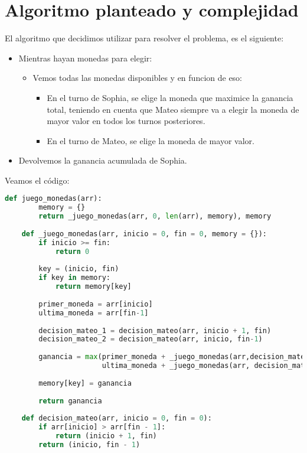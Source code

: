 \section{Algoritmo planteado y complejidad}

El algoritmo que decidimos utilizar para resolver el problema, es el siguiente:

\begin {itemize}
\item Mientras hayan monedas para elegir:
    \begin {itemize}
    \item Vemos todas las monedas disponibles y en funcion de eso:
        \begin {itemize}
        \item En el turno de Sophia, se elige la moneda que maximice la ganancia total, teniendo en cuenta que Mateo siempre va a elegir la moneda de mayor valor en todos los turnos posteriores.
        \item En el turno de Mateo, se elige la moneda de mayor valor.
        \end {itemize}
    \end {itemize}
\item Devolvemos la ganancia acumulada de Sophia.
\end {itemize}

Veamos el código:
\begin{lstlisting}[language=Python]
    def juego_monedas(arr):
        memory = {}
        return _juego_monedas(arr, 0, len(arr), memory), memory
    
    def _juego_monedas(arr, inicio = 0, fin = 0, memory = {}):
        if inicio >= fin:
            return 0
        
        key = (inicio, fin)
        if key in memory:
            return memory[key]
    
        primer_moneda = arr[inicio]
        ultima_moneda = arr[fin-1]
        
        decision_mateo_1 = decision_mateo(arr, inicio + 1, fin)
        decision_mateo_2 = decision_mateo(arr, inicio, fin-1)
    
        ganancia = max(primer_moneda + _juego_monedas(arr,decision_mateo_1[0],decision_mateo_1[1], memory), 
                       ultima_moneda + _juego_monedas(arr, decision_mateo_2[0], decision_mateo_2[1], memory))
        
        memory[key] = ganancia
    
        return ganancia
        
    def decision_mateo(arr, inicio = 0, fin = 0):
        if arr[inicio] > arr[fin - 1]:
            return (inicio + 1, fin)
        return (inicio, fin - 1)    
\end{lstlisting}


